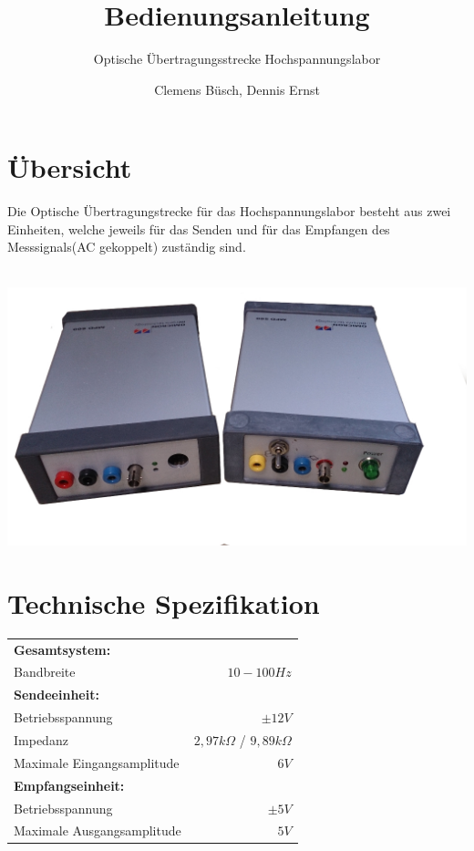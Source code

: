 \documentclass[10pt,a4paper]{scrartcl}
\begin{document}
\title{Bedienungsanleitung}
\author{Clemens Büsch, Dennis Ernst}
\date{}
\subtitle{Optische Übertragungsstrecke Hochspannungslabor}
\maketitle
\tableofcontents

\newpage
\section{Übersicht}
Die Optische Übertragungstrecke für das Hochspannungslabor besteht aus zwei Einheiten, welche jeweils für das Senden und für das Empfangen des Messsignals(AC gekoppelt) zuständig sind.  \\ \\ 
\begin{center}
\includegraphics[scale=0.4]{gfx/title.JPG}
\end{center}


\section{Technische Spezifikation}
\begin{table}[h!]
\centering 
\begin{tabular}{@{} lr @{}}
 \toprule
 \textbf{Gesamtsystem:} \\
 Bandbreite & $10-100 Hz$ \\
  \midrule
  \textbf{Sendeeinheit:} \\
  Betriebsspannung & $\pm 12V$ \\
  Impedanz & $2,97k\Omega$ / $9,89k\Omega$   \\
  Maximale Eingangsamplitude & $6 V$\\
  \midrule
  \textbf{Empfangseinheit:}\\
  Betriebsspannung & $\pm 5V$ \\
  Maximale Ausgangsamplitude &$ 5V$\\
  
 \bottomrule
\end{tabular}

\end{table}
\newpage
\end{document}
